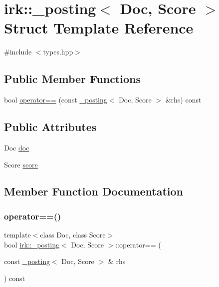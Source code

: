 \hypertarget{structirk_1_1__posting}{}\section{irk\+:\+:\+\_\+posting$<$ Doc, Score $>$ Struct Template Reference}
\label{structirk_1_1__posting}


{\ttfamily \#include $<$types.\+hpp$>$}

\subsection*{Public Member Functions}
\begin{DoxyCompactItemize}
\item 
bool \mbox{\hyperlink{structirk_1_1__posting_af841ff51de9ac20ce34588b45aff7d5d}{operator==}} (const \mbox{\hyperlink{structirk_1_1__posting}{\+\_\+posting}}$<$ Doc, Score $>$ \&rhs) const
\end{DoxyCompactItemize}
\subsection*{Public Attributes}
\begin{DoxyCompactItemize}
\item 
Doc \mbox{\hyperlink{structirk_1_1__posting_a29e93e3e5073ea27ef621e57dc32ff17}{doc}}
\item 
Score \mbox{\hyperlink{structirk_1_1__posting_ac2f926fe8b05ab8d4d2cd2199910d82f}{score}}
\end{DoxyCompactItemize}


\subsection{Member Function Documentation}
\mbox{\label{structirk_1_1__posting_af841ff51de9ac20ce34588b45aff7d5d}} 
\subsubsection{\texorpdfstring{operator==()}{operator==()}}
{\footnotesize\ttfamily template$<$class Doc, class Score$>$ \\
bool \mbox{\hyperlink{structirk_1_1__posting}{irk\+::\+\_\+posting}}$<$ Doc, Score $>$\+::operator== (\begin{DoxyParamCaption}\item[{const \mbox{\hyperlink{structirk_1_1__posting}{\+\_\+posting}}$<$ Doc, Score $>$ \&}]{rhs }\end{DoxyParamCaption}) const\hspace{0.3cm}{\ttfamily [inline]}}



